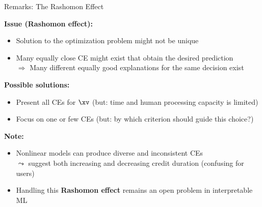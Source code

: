 \documentclass[11pt,compress,t,notes=noshow, aspectratio=169, xcolor=table, usenames,dvipsnames]{beamer}
\begin{document}
\begin{frame}{Remarks: The Rashomon Effect}

\textbf{Issue (\textbf{Rashomon effect}):}
\begin{itemize}
    \item Solution to the optimization problem might not be unique
    \item Many equally close CE might exist that obtain the desired prediction\\
    $\Rightarrow$ Many different equally good explanations for the same decision exist
\end{itemize}

\lz\pause

\textbf{Possible solutions:}
	\begin{itemize}
	\item Present all CEs for $\xv$ (but: time and human processing capacity is limited)
		\item Focus on one or few CEs (but: by which criterion should guide this choice?)
	\end{itemize}
	
\lz\pause

\textbf{Note:}
	\begin{itemize}
      \item Nonlinear models can produce diverse and inconsistent CEs\\
  $\leadsto$ suggest both increasing and decreasing credit duration (confusing for users)
  \item Handling this \textbf{Rashomon effect} remains an open problem in interpretable ML
	\end{itemize}
\end{frame}
\end{document}
